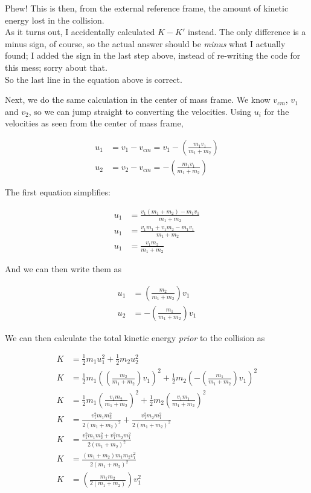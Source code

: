 Phew! This is then, from the external reference frame, the amount of kinetic energy lost in the collision.\\
As it turns out, I accidentally calculated $K - K'$ instead. The only difference is a minus sign, of course, so the actual answer should be \emph{minus} what I actually found; I added the sign in the last step above, instead of re-writing the code for this mess; sorry about that.\\
So the last line in the equation above is correct.

Next, we do the same calculation in the center of mass frame. We know $v_{cm}$, $v_1$ and $v_2$, so we can jump straight to converting the velocities. Using $u_i$ for the velocities as seen from the center of mass frame,

\begin{align}
u_1 &= v_1 - v_{cm} = v_1 - \left(\frac{m_1 v_1}{m_1 + m_2}\right)\\
u_2 &= v_2 - v_{cm} = - \left(\frac{m_1 v_1}{m_1 + m_2}\right)
\end{align}

The first equation simplifies:

\begin{align}
u_1 &= \frac{v_1(m_1 + m_2) - m_1 v_1}{m_1 + m_2}\\
u_1 &= \frac{v_1 m_1 + v_1 m_2 - m_1 v_1}{m_1 + m_2}\\
u_1 &= \frac{v_1 m_2}{m_1 + m_2}
\end{align}

And we can then write them as

\begin{align}
u_1 &= \left(\frac{m_2}{m_1 + m_2}\right) v_1\\
u_2 &= - \left(\frac{m_1}{m_1 + m_2}\right) v_1
\end{align}

We can then calculate the total kinetic energy \emph{prior} to the collision as

\begin{align}
K &= \frac{1}{2} m_1 u_1^2 + \frac{1}{2} m_2 u_2^2\\
K &= \frac{1}{2} m_1 \left(\left(\frac{m_2}{m_1 + m_2}\right) v_1\right)^2 + \frac{1}{2} m_2 \left(- \left(\frac{m_1}{m_1 + m_2}\right) v_1\right)^2\\
K &= \frac{1}{2} m_1 \left(\frac{v_1 m_2}{m_1 + m_2}\right)^2 + \frac{1}{2} m_2 \left(\frac{v_1 m_1}{m_1 + m_2}\right)^2\\
K &= \frac{v_1^2 m_1 m_2^2}{2(m_1 + m_2)^2} + \frac{v_1^2 m_2 m_1^2}{2(m_1 + m_2)^2}\\
K &= \frac{v_1^2 m_1 m_2^2 + v_1^2 m_2 m_1^2}{2(m_1 + m_2)^2}\\
K &= \frac{(m_1 + m_2) m_1 m_2 v_1^2}{2(m_1 + m_2)^2}\\
K &= \left(\frac{m_1 m_2}{2(m_1 + m_2)}\right) v_1^2
\end{align}

